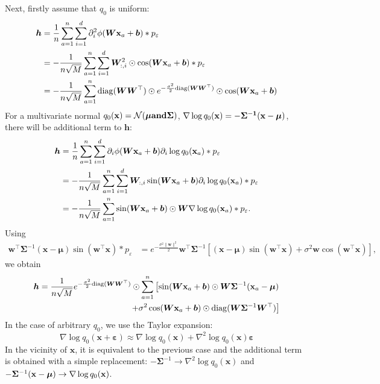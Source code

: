     Next, firstly assume that $q_0$ is uniform:
    \begin{align*}
        {\bm h}
        &= \frac{1}{n}\sum_{a = 1}^n\sum_{i = 1}^d \partial_i^2 \phi(\bm{W}{\bf x}_a + \bm{b}) * p_{\varepsilon}\\
        &= -\frac{1}{n\sqrt{M}}\sum_{a = 1}^n\sum_{i = 1}^d \bm{W}_{:, i}^2 \odot \cos(\bm{W}{\bf x}_a + \bm{b}) * p_{\varepsilon}\\
        &= -\frac{1}{n\sqrt{M}}\sum_{a = 1}^n {\rm diag}(\bm{W}\bm{W}^{\top})\odot e^{-\frac{\sigma^2}{2}{\rm diag}(\bm{W}\bm{W}^{\top})} \odot \cos(\bm{W}{\bf x}_a + \bm{b})
    \end{align*}
    For a multivariate normal $q_0(\bf x) = {\cal N}({\bm \mu} and {\bm \Sigma})$, $\nabla\log q_0(\bf x) = -{\bm \Sigma}^{-1}({\bf x} - {\bm \mu})$, there will be additional term to ${\bm h}$:
    \begin{align*}
        {\bm h}
        &= \frac{1}{n}\sum_{a = 1}^n\sum_{i = 1}^d \partial_i \phi(\bm{W}{\bf x}_a + \bm{b})\partial_i \log q_0({\bf x}_a) * p_{\varepsilon}\\
        &= -\frac{1}{n\sqrt{M}}\sum_{a = 1}^n\sum_{i = 1}^d \bm{W}_{:, i}\sin(\bm{W}{\bf x}_a + \bm{b})\partial_i \log q_0({\bf x}_a) * p_{\varepsilon}\\
        &= -\frac{1}{n\sqrt{M}} \sum_{a = 1}^n \sin(\bm{W}{\bf x}_a + \bm{b}) \odot \bm{W} \nabla\log q_0({\bf x}_a) * p_{\varepsilon}.
    \end{align*}
    Using
    \begin{align*}
    \mathbf{w}^\top {\bm \Sigma}^{-1}(\mathbf{x} - {\bm \mu}) \sin (\mathbf{w}^\top \mathbf{x}) * p_{\varepsilon}
    &=
    e^{-\frac{\sigma^2 \|\mathbf{w}\|^2}{2}}
    \mathbf{w}^\top{\bm \Sigma}^{-1}\left [
        (\mathbf{x} - {\bm \mu})\sin(\mathbf{w}^\top \mathbf{x}) + \sigma^2 \mathbf{w}\cos(\mathbf{w}^\top \mathbf{x})
    \right ],
    \end{align*}
    we obtain
    \begin{align}
        {\bm h} = \frac{1}{n\sqrt{M}}e^{-\frac{\sigma^2}{2}{\rm diag}(\bm{W}\bm{W}^{\top})} \odot \sum_{a = 1}^n \left[\sin(\bm{W}{\bf x}_a + \bm{b}) \odot {\bm W}{\bm \Sigma}^{-1}({\bf x}_a - {\bm \mu})
        \right . \nonumber\\
        \left .
        + \sigma^2\cos(\bm{W}{\bf x}_a + \bm{b})\odot {\rm diag}(\bm{W}{\bm \Sigma}^{-1}\bm{W}^{\top})
        \right]
    \end{align}
    In the case of arbitrary $q_0$, we use the Taylor expansion:
    \begin{equation*}
        \nabla \log q_0(\mathbf{x} + {\bm \varepsilon}) \approx
        \nabla \log q_0(\mathbf{x}) + \nabla^2 \log q_0(\mathbf{x}) {\bm \varepsilon}
    \end{equation*}
    In the vicinity of $\mathbf{x}$, it is equivalent to the previous case and the additional term is obtained with a simple replacement: $-{\bm \Sigma}^{-1} \to \nabla^2 \log q_0(\mathbf{x})$ and $-{\bm \Sigma}^{-1}({\bf x} - {\bm \mu}) \to \nabla \log q_0(\mathbf{x})$.

